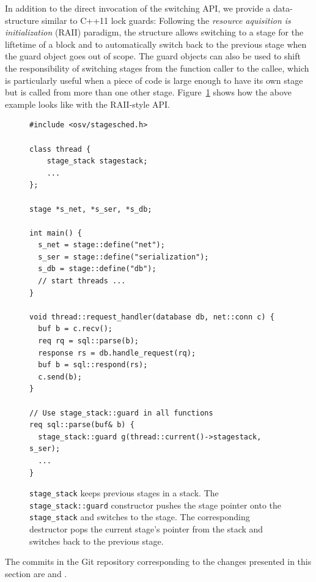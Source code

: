 \documentclass[12pt,a4paper]{book}
\begin{document}
In addition to the direct invocation of the switching API, we provide a data-structure similar to C++11 lock guards:
Following the \emph{resource aquisition is initialization} (RAII) paradigm, the structure allows switching to a stage for the liftetime of a block and to automatically switch back to the previous stage when the guard object goes out of scope.
The guard objects can also be used to shift the responsibility of switching stages from the function caller to the callee, which is particularly useful when a piece of code is large enough to have its own stage but is called from more than one other stage.
Figure~\ref{fig:di:api:examplestack} shows how the above example looks like with the RAII-style API.

\begin{figure}
\begin{lstlisting}[style=figurecpp,morekeywords={stage_stack,stage,stage::define,stage_stack::guard}]
#include <osv/stagesched.h>

class thread {
    stage_stack stagestack;
    ...
};

stage *s_net, *s_ser, *s_db;

int main() {
  s_net = stage::define("net");
  s_ser = stage::define("serialization");
  s_db = stage::define("db");
  // start threads ...
}

void thread::request_handler(database db, net::conn c) {
  buf b = c.recv();
  req rq = sql::parse(b);
  response rs = db.handle_request(rq);
  buf b = sql::respond(rs);
  c.send(b);
}

// Use stage_stack::guard in all functions
req sql::parse(buf& b) {
  stage_stack::guard g(thread::current()->stagestack, s_ser);
  ...
}

\end{lstlisting}
\caption{\lstinline[style=figurecpp]{stage_stack} keeps previous stages in a stack.
    The \lstinline[style=figurecpp]{stage_stack::guard} constructor pushes the stage pointer onto the \lstinline[style=figurecpp]{stage_stack} and switches to the stage.
    The corresponding destructor pops the current stage's pointer from the stack and switches back to the previous stage.}
\label{fig:di:api:examplestack}
\end{figure}

The commits in the Git repository corresponding to the changes presented in this section are  and .
\end{document}
